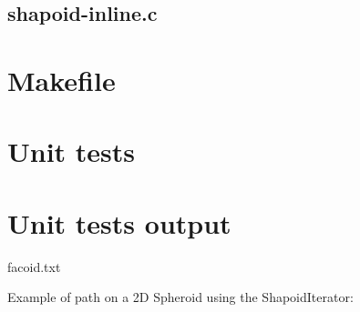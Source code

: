 \subsection{shapoid-inline.c}

\begin{scriptsize}
\begin{ttfamily}

\end{ttfamily}
\end{scriptsize}

\section{Makefile}

\begin{scriptsize}
\begin{ttfamily}

\end{ttfamily}
\end{scriptsize}

\section{Unit tests}

\begin{scriptsize}
\begin{ttfamily}

\end{ttfamily}
\end{scriptsize}

\section{Unit tests output}

\begin{scriptsize}
\begin{ttfamily}

\end{ttfamily}
\end{scriptsize}

facoid.txt

\begin{scriptsize}
\begin{ttfamily}

\end{ttfamily}
\end{scriptsize}

Example of path on a 2D Spheroid using the ShapoidIterator:\\

